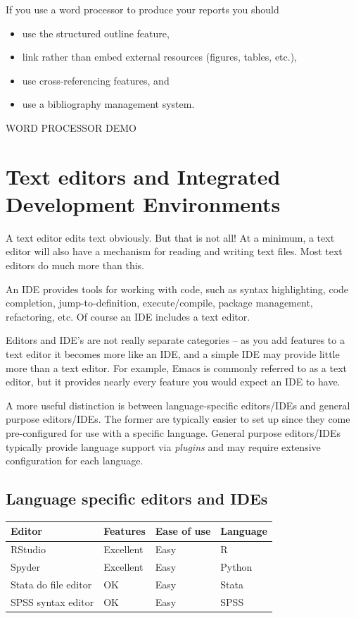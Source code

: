 \documentclass[]{book}
\providecommand{\tightlist}{%
  \setlength{\itemsep}{0pt}\setlength{\parskip}{0pt}}
\begin{document}
If you use a word processor to produce your reports you should

\begin{itemize}
\tightlist
\item
  use the structured outline feature,
\item
  link rather than embed external resources (figures, tables, etc.),
\item
  use cross-referencing features, and
\item
  use a bibliography management system.
\end{itemize}

WORD PROCESSOR DEMO

\section{Text editors and Integrated Development
Environments}\label{text-editors-and-integrated-development-environments}

A text editor edits text obviously. But that is not all! At a minimum, a
text editor will also have a mechanism for reading and writing text
files. Most text editors do much more than this.

An IDE provides tools for working with code, such as syntax
highlighting, code completion, jump-to-definition, execute/compile,
package management, refactoring, etc. Of course an IDE includes a text
editor.

Editors and IDE's are not really separate categories -- as you add
features to a text editor it becomes more like an IDE, and a simple IDE
may provide little more than a text editor. For example, Emacs is
commonly referred to as a text editor, but it provides nearly every
feature you would expect an IDE to have.

A more useful distinction is between language-specific editors/IDEs and
general purpose editors/IDEs. The former are typically easier to set up
since they come pre-configured for use with a specific language. General
purpose editors/IDEs typically provide language support via
\emph{plugins} and may require extensive configuration for each
language.

\subsection{Language specific editors and
IDEs}\label{language-specific-editors-and-ides}

\begin{longtable}[]{@{}llll@{}}
\toprule
Editor & Features & Ease of use & Language\tabularnewline
\midrule
\endhead
RStudio & Excellent & Easy & R\tabularnewline
Spyder & Excellent & Easy & Python\tabularnewline
Stata do file editor & OK & Easy & Stata\tabularnewline
SPSS syntax editor & OK & Easy & SPSS\tabularnewline
\bottomrule
\end{longtable}
\end{document}
